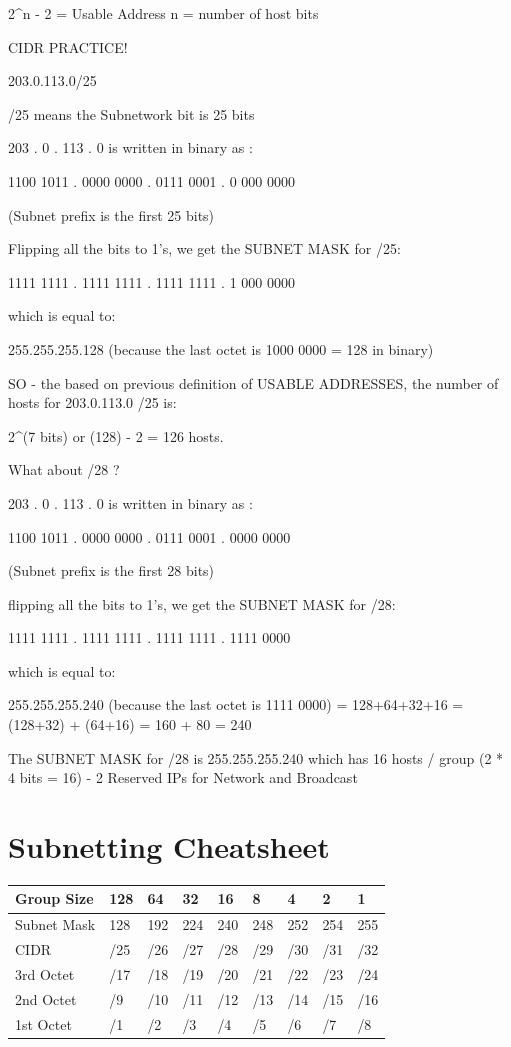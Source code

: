 2\^{}n - 2 = Usable Address n = number of host bits

CIDR PRACTICE!

203.0.113.0/25

/25 means the Subnetwork bit is 25 bits

203 . 0 . 113 . 0 is written in binary as :

1100 1011 . 0000 0000 . 0111 0001 . 0 \textbar{} 000 0000

(Subnet prefix is the first 25 bits)

Flipping all the bits to 1's, we get the SUBNET MASK for /25:

1111 1111 . 1111 1111 . 1111 1111 . 1 \textbar{} 000 0000

which is equal to:

255.255.255.128 (because the last octet is 1000 0000 = 128 in binary)

SO - the based on previous definition of USABLE ADDRESSES, the number of
hosts for 203.0.113.0 /25 is:

2\^{}(7 bits) or (128) - 2 = 126 hosts.

What about /28 ?

203 . 0 . 113 . 0 is written in binary as :

1100 1011 . 0000 0000 . 0111 0001 . 0000 \textbar{} 0000

(Subnet prefix is the first 28 bits)

flipping all the bits to 1's, we get the SUBNET MASK for /28:

1111 1111 . 1111 1111 . 1111 1111 . 1111 \textbar{} 0000

which is equal to:

255.255.255.240 (because the last octet is 1111 0000) = 128+64+32+16 =
(128+32) + (64+16) = 160 + 80 = 240

The SUBNET MASK for /28 is 255.255.255.240 which has 16 hosts / group (2
* 4 bits = 16) - 2 Reserved IPs for Network and Broadcast

\section{Subnetting Cheatsheet}\label{subnetting-cheatsheet}

{\def\LTcaptype{none} %
\begin{longtable}[]{@{}lllllllll@{}}
\toprule\noalign{}
Group Size & 128 & 64 & 32 & 16 & 8 & 4 & 2 & 1 \\
\midrule\noalign{}
\endhead
\bottomrule\noalign{}
\endlastfoot
Subnet Mask & 128 & 192 & 224 & 240 & 248 & 252 & 254 & 255 \\
CIDR & /25 & /26 & /27 & /28 & /29 & /30 & /31 & /32 \\
3rd Octet & /17 & /18 & /19 & /20 & /21 & /22 & /23 & /24 \\
2nd Octet & /9 & /10 & /11 & /12 & /13 & /14 & /15 & /16 \\
1st Octet & /1 & /2 & /3 & /4 & /5 & /6 & /7 & /8 \\
\end{longtable}
}

